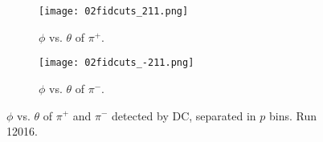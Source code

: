     \begin{figure}
        \begin{subfigure}[b]{\textwidth}
            \texttt{[image: 02fidcuts\_211.png]}
            \caption{$\phi$ vs. $\theta$ of $\pi^+$.}
            \label{fig::20.02::fiducial_cuts_pid211}
        \end{subfigure}
        \begin{subfigure}[b]{\textwidth}
            \texttt{[image: 02fidcuts\_-211.png]}
            \caption{$\phi$ vs. $\theta$ of $\pi^-$.}
            \label{fig::20.02::fiducial_cuts_pid-211}
        \end{subfigure}

        \caption[$\phi$ vs. $\theta$ of $\pi^+$ and $\pi^-$, separated in $p$ bins.]
        {$\phi$ vs. $\theta$ of $\pi^+$ and $\pi^-$ detected by DC, separated in $p$ bins.
        Run 12016.}
        \label{fig::20.02::fiducial_cuts_pions}
    \end{figure}

    \pagebreak
